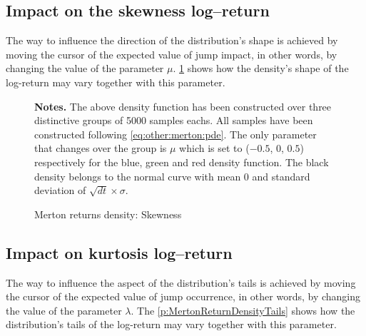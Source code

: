 \documentclass[12pt,a4paper]{report}
\begin{document}
\subsection{Impact on the skewness log--return}
\label{sub:MertonSkewness}

The way to influence the direction of the distribution's shape is achieved by moving the cursor of the expected value of jump impact, in other words, by changing the value of the parameter $\mu$. \cref{plot:MertonReturnDensity} shows how the density's shape of the log-return may vary together with this parameter.


\begin{figure}[h]
\centering

\caption{Merton returns density: Skewness}
  \begin{changemargin}{0.5cm}{0.5cm}
  \medskip
\footnotesize
{}\textbf{Notes.} The above density function has been constructed over three distinctive groups of 5000 samples eachs. All samples have been constructed following \cref{eq:other:merton:pde}. The only parameter that changes over the group is $\mu$ which is set to ($-0.5$, $0$, $0.5$) respectively for the blue, green and red density function. The black density belongs to the normal curve with mean 0 and standard deviation of $\sqrt{dt} \times \sigma$.  
\end{changemargin}
\label{plot:MertonReturnDensity}
\end{figure}

\subsection{Impact on kurtosis log--return}
\label{sub:MertonKurtosis}

The way to influence the aspect of the distribution's tails is achieved by moving the cursor of the expected value of jump occurrence, in other words, by changing the value of the parameter $\lambda$. The \cref{p:MertonReturnDensityTails} shows how the distribution's tails of the log-return may vary together with this parameter.
\end{document}
